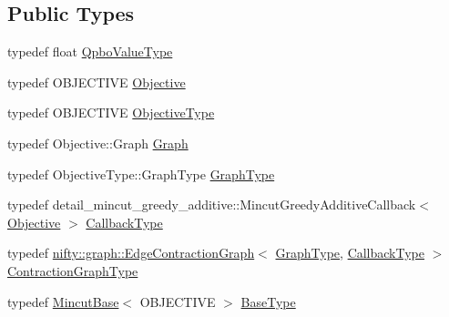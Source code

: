 \subsection*{Public Types}
\begin{DoxyCompactItemize}
\item 
typedef float \hyperlink{classnifty_1_1graph_1_1optimization_1_1mincut_1_1MincutGreedyAdditive_abdafbf04d9535e596dc1e746a286d527}{Qpbo\+Value\+Type}
\item 
typedef O\+B\+J\+E\+C\+T\+I\+V\+E \hyperlink{classnifty_1_1graph_1_1optimization_1_1mincut_1_1MincutGreedyAdditive_a231a53c994cb17fbcd60cb2bcc4152f3}{Objective}
\item 
typedef O\+B\+J\+E\+C\+T\+I\+V\+E \hyperlink{classnifty_1_1graph_1_1optimization_1_1mincut_1_1MincutGreedyAdditive_a56dbeb806116fc9dfab1a53ab6f3dfd2}{Objective\+Type}
\item 
typedef Objective\+::\+Graph \hyperlink{classnifty_1_1graph_1_1optimization_1_1mincut_1_1MincutGreedyAdditive_a47ab8e725aaf16f5f27805c5c9bb1202}{Graph}
\item 
typedef Objective\+Type\+::\+Graph\+Type \hyperlink{classnifty_1_1graph_1_1optimization_1_1mincut_1_1MincutGreedyAdditive_a1a09c513454d8fc5d51d4a8cb28d5c54}{Graph\+Type}
\item 
typedef detail\+\_\+mincut\+\_\+greedy\+\_\+additive\+::\+Mincut\+Greedy\+Additive\+Callback$<$ \hyperlink{classnifty_1_1graph_1_1optimization_1_1mincut_1_1MincutGreedyAdditive_a231a53c994cb17fbcd60cb2bcc4152f3}{Objective} $>$ \hyperlink{classnifty_1_1graph_1_1optimization_1_1mincut_1_1MincutGreedyAdditive_a2a20d815b0e3c083ed85bcb4c1b60bc6}{Callback\+Type}
\item 
typedef \hyperlink{classnifty_1_1graph_1_1EdgeContractionGraph}{nifty\+::graph\+::\+Edge\+Contraction\+Graph}$<$ \hyperlink{classnifty_1_1graph_1_1optimization_1_1mincut_1_1MincutGreedyAdditive_a1a09c513454d8fc5d51d4a8cb28d5c54}{Graph\+Type}, \hyperlink{classnifty_1_1graph_1_1optimization_1_1mincut_1_1MincutGreedyAdditive_a2a20d815b0e3c083ed85bcb4c1b60bc6}{Callback\+Type} $>$ \hyperlink{classnifty_1_1graph_1_1optimization_1_1mincut_1_1MincutGreedyAdditive_a3db08a332c5b2d05634f10afd38a472b}{Contraction\+Graph\+Type}
\item 
typedef \hyperlink{classnifty_1_1graph_1_1optimization_1_1mincut_1_1MincutBase}{Mincut\+Base}$<$ O\+B\+J\+E\+C\+T\+I\+V\+E $>$ \hyperlink{classnifty_1_1graph_1_1optimization_1_1mincut_1_1MincutGreedyAdditive_a5864f86ae8949a1a6a2074cb031e7973}{Base\+Type}
\item 

\end{DoxyCompactItemize}
